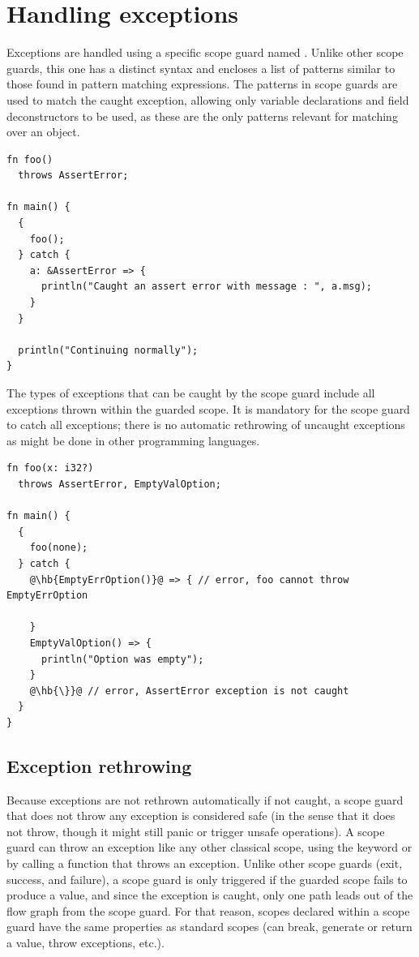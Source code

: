 \section{Handling exceptions}
\label{sec:catching_errors}

Exceptions are handled using a specific scope guard named . Unlike
other scope guards, this one has a distinct syntax and encloses a list of
patterns similar to those found in pattern matching expressions. The patterns in
 scope guards are used to match the caught exception, allowing only
variable declarations and field deconstructors to be used, as these are the only
patterns relevant for matching over an object.


\begin{lstlisting}[style=coloredverbatim]
fn foo()
  throws AssertError;

fn main() {
  {
    foo();
  } catch {
    a: &AssertError => {
      println("Caught an assert error with message : ", a.msg);
    }
  }

  println("Continuing normally");
}
\end{lstlisting}

The types of exceptions that can be caught by the  scope guard
include all exceptions thrown within the guarded scope. It is mandatory for the
scope guard to catch all exceptions; there is no automatic rethrowing of
uncaught exceptions as might be done in other programming languages.

\begin{lstlisting}[style=coloredverbatimError, escapechar=@]
fn foo(x: i32?)
  throws AssertError, EmptyValOption;

fn main() {
  {
    foo(none);
  } catch {
    @\hb{EmptyErrOption()}@ => { // error, foo cannot throw EmptyErrOption

    }
    EmptyValOption() => {
      println("Option was empty");
    }
    @\hb{\}}@ // error, AssertError exception is not caught
  }
}
\end{lstlisting}

\subsection{Exception rethrowing}

Because exceptions are not rethrown automatically if not caught, a 
scope guard that does not throw any exception is considered safe (in the sense
that it does not throw, though it might still panic or trigger unsafe
operations). A  scope guard can throw an exception like any other
classical scope, using the keyword  or by calling a function that
throws an exception. Unlike other scope guards (exit, success, and failure), a
 scope guard is only triggered if the guarded scope fails to
produce a value, and since the exception is caught, only one path leads out of
the flow graph from the scope guard. For that reason, scopes declared within a
 scope guard have the same properties as standard scopes (can
break, generate or return a value, throw exceptions, etc.).


